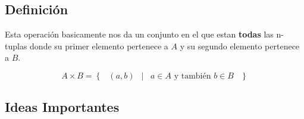 \documentclass[12pt, fleqn]{report}                             %
\DeclareMathOperator \Space {\quad}                             %
\DeclareMathOperator \MiniSpace {\;}                            %
\newcommand \Such {\MiniSpace|\MiniSpace}                       %
\newcommand{\Set}[1]{\left\{ \MiniSpace #1 \MiniSpace \right\}} %
\begin{document}
            \clearpage
            \subsection*{Definición}

                Esta operación basicamente nos da un conjunto en el que estan \textbf{todas} las n-tuplas
                donde su primer elemento pertenece a $A$ y su segundo elemento pertenece a $B$.

                \begin{equation}
                    A \times B = \Set{ (a, b) \Such a \in A \text{ y también } b \in B }
                \end{equation}


            \subsection{Ideas Importantes}
\end{document}
